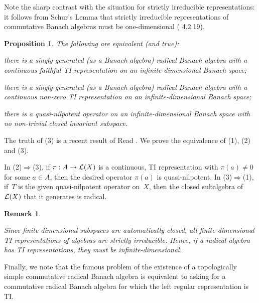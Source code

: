 \documentclass[11pt]{article}
\newcounter{arbenum}
\newenvironment{arbenumerate}{\begin{list}{{\rm(\arabic{arbenum})}}%
{\usecounter{arbenum}}}{\end{list}}
\newcommand{\sseq}{\subseteq}
\newtheorem{prop}[thm]{Proposition}
\newenvironment{Proof}{{\it Proof. }}{}%
\newtheorem{remk}[thm]{Remark}
\newenvironment{Remark}{\begin{remk}\begin{rm}}{\end{rm}\end{remk}}
\newcommand{\Detail}[1]{}
\newcommand{\LX}{{\cal L}(X)}
\begin{document}
Note the sharp contrast with the situation for strictly irreducible
representations:  it follows from Schur's Lemma that strictly irreducible representations of commutative
Banach algebras must be one-dimensional (\cite{Palmerbk} 4.2.19).

\begin{prop}\label{P3}
The following are equivalent (and true):
\begin{arbenumerate}
\item there is a singly-generated (as a Banach algebra) radical Banach algebra
with a continuous faithful TI representation on an infinite-dimensional Banach
space;
\item there is a singly-generated (as a Banach algebra) radical Banach algebra
with a continuous non-zero TI representation on an
infinite-dimensional Banach space;
\item there is a quasi-nilpotent operator on an infinite-dimensional Banach
space with no non-trivial closed invariant subspace.
\end{arbenumerate}
\end{prop}

\begin{Proof}
The truth of (3) is a recent result of Read \cite{Readqn}.   We prove the
equivalence of (1), (2) and (3).

In (2)$\Rightarrow$(3), if $\pi:A\to\LX$ is a continuous, TI representation with
$\pi(a)\ne 0$ for some $a\in A$, then the desired operator $\pi(a)$ is
quasi-nilpotent.  In (3)$\Rightarrow$(1), if~$T$ is the given quasi-nilpotent operator
on~$X$, then the closed subalgebra of $\LX$ that it generates is radical.
\Detail{Since~$T$ is quasi-nilpotent, so are all the polynomials in~$T$.   The
closed subalgebra $A \sseq \LX$ generated by~$T$ is a commutative Banach
algebra, so its Jacobson radical is the set of all quasi-nilpotents and this set
is closed.  Since the polynomials in~$T$ are dense in~$A$, it follows that~$A$
is Jacobson radical.}
\end{Proof}

\begin{Remark}
Since finite-dimensional subspaces are automatically closed, all
finite-dimensional TI representations of algebras are strictly irreducible.
Hence, if a radical algebra has TI representations, they must be
infinite-dimensional.
\end{Remark}

Finally, we note that the famous problem of the existence of a topologically
simple commutative radical Banach algebra is equivalent to asking for a
commutative radical Banach algebra for which the left regular representation
is TI.
\end{document}
